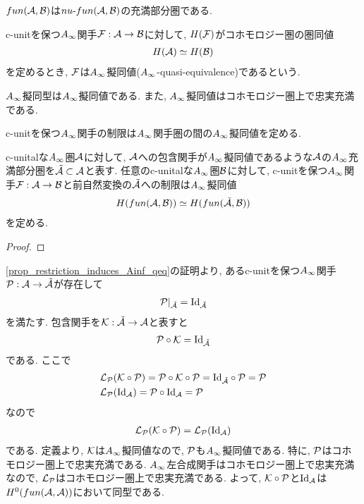 \documentclass[uplatex, a4paper, 14Q, dvipdfmx]{jsarticle}
\begin{document}
\begin{remark}
  $\fun{\A}{\B}$は$\nufun{\A}{\B}$の充満部分圏である. 
\end{remark}

\begin{definition}
  c-unitを保つ$\Ainf$関手$\F : \A \to \B$に対して, $H(\F)$がコホモロジー圏の圏同値
  \begin{align*}
    H(\A) \simeq H(\B)
  \end{align*}
  を定めるとき, $\F$は$\Ainf$擬同値($\Ainf$-quasi-equivalence)であるという. 
\end{definition}

\begin{example} \label{eg_Ainf_qeq_is_cohomologically_fully_faithful}
  $\Ainf$擬同型は$\Ainf$擬同値である. 
  また, $\Ainf$擬同値はコホモロジー圏上で忠実充満である. 
\end{example}

c-unitを保つ$\Ainf$関手の制限は$\Ainf$関手圏の間の$\Ainf$擬同値を定める. 

\begin{lemma} \label{prop_restriction_induces_Ainf_qeq}
  c-unitalな$\Ainf$圏$\A$に対して, $\A$への包含関手が$\Ainf$擬同値であるような$\A$の$\Ainf$充満部分圏を$\tilA \subset \A$と表す. 
  任意のc-unitalな$\Ainf$圏$\B$に対して, c-unitを保つ$\Ainf$関手$\F : \A \to \B$と前自然変換の$\tilA$への制限は$\Ainf$擬同値
  \begin{align*}
    H(\fun{\A}{\B}) \simeq H(\fun{\tilA}{\B})
  \end{align*}
  を定める. 
\end{lemma}

\begin{proof}
  
\end{proof}

\begin{remark} \label{rem_inclusion_induces_iso_in_H^0}
  \cref{prop_restriction_induces_Ainf_qeq}の証明より, あるc-unitを保つ$\Ainf$関手$\P : \A \to \tilA$が存在して
  \begin{align*}
    \P|_{\tilA} = \Id_{\tilA}
  \end{align*}
  を満たす. 
  包含関手を$\K : \tilA \to \A$と表すと
  \begin{align*}
    \P \circ \K = \Id_{\tilA}
  \end{align*}
  である. 
  ここで
  \begin{align*}
    &\L_\P(\K \circ \P) = \P \circ \K \circ \P = \Id_{\tilA} \circ \P = \P \\
    &\L_\P(\Id_\A) = \P \circ \Id_\A = \P
  \end{align*}
  なので
  \begin{align*}
    \L_\P(\K \circ \P) = \L_\P(\Id_\A)
  \end{align*}
  である.
  定義より, $\K$は$\Ainf$擬同値なので, $\P$も$\Ainf$擬同値である. 
  特に, $\P$はコホモロジー圏上で忠実充満である. 
  $\Ainf$左合成関手はコホモロジー圏上で忠実充満なので, $\L_\P$はコホモロジー圏上で忠実充満である.
  よって, $\K \circ \P$と$\Id_\A$は$H^0(\fun{\A}{\A})$において同型である. 
\end{remark}
\end{document}
